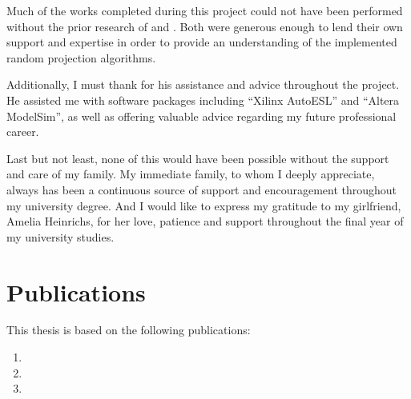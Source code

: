 \documentclass[a4paper]{report}
\begin{document}
Much of the works completed during this project could not have been performed
without the prior research of  and . Both were
generous enough to lend their own support and expertise in order to provide an
understanding of the implemented random projection algorithms.

Additionally, I must thank  for his assistance and advice
throughout the project. He assisted me with software packages including ``Xilinx
AutoESL'' and ``Altera ModelSim'', as well as offering valuable advice regarding
my future professional career.

Last but not least, none of this would have been possible without the support
and care of my family. My immediate family, to whom I deeply appreciate, always
has been a continuous source of support and encouragement throughout my
university degree. And I would like to express my gratitude to my girlfriend,
Amelia Heinrichs, for her love, patience and support throughout the final year
of my university studies.

\clearpage
{}
\chapter*{Publications}
\label{publications}
This thesis is based on the following publications:
\begin{enumerate}
\item {}
\item {}
\item {}
\end{enumerate}
\end{document}
